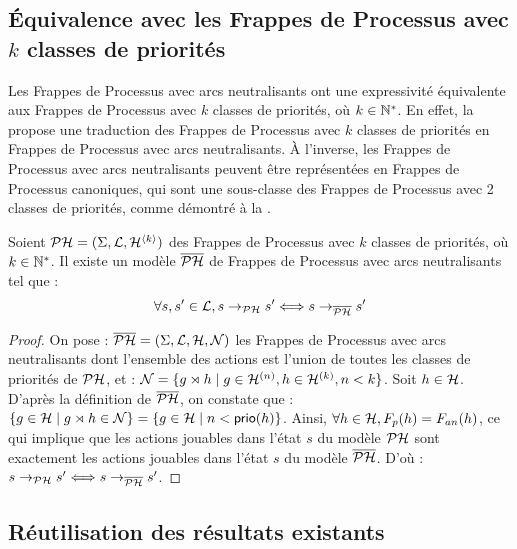 \subsection{Équivalence avec les Frappes de Processus avec $k$ classes de priorités}

Les Frappes de Processus avec arcs neutralisants ont une expressivité équivalente
aux Frappes de Processus avec $k$ classes de priorités, où $k \in \mathbb{N}^*$.
En effet, la  propose une traduction des Frappes de Processus
avec $k$ classes de priorités en Frappes de Processus avec arcs neutralisants.
À l'inverse, les Frappes de Processus avec arcs neutralisants peuvent être représentées
en Frappes de Processus canoniques, qui sont une sous-classe des Frappes de Processus avec
2 classes de priorités, comme démontré à la .

\begin{theorem}
  Soient $\mathcal{PH} = (\Sigma, \mathcal{L}, \mathcal{H}^{{\langle k \rangle}})$ des Frappes de Processus avec $k$ classes
  de priorités, où $k \in \mathbb{N}^*$.
  Il existe un modèle $\overline{\mathcal{PH}}$ de Frappes de Processus avec arcs neutralisants tel que :
  \[\forall s, s' \in \mathcal{L}, s \rightarrow_{\mathcal{PH}} s' \Longleftrightarrow s \rightarrow_{\overline{\mathcal{PH}}} s' \]
\end{theorem}

\begin{proof}
  On pose : $\overline{\mathcal{PH}} = (\Sigma, \mathcal{L}, \mathcal{H}, \mathcal{N})$ les Frappes de Processus avec arcs neutralisants
  dont l'ensemble des actions est l'union de toutes les classes de priorités de $\mathcal{PH}$, et :
  $\mathcal{N} = \{ g\rtimes h \mid g \in \mathcal{H}^{(n)}, h \in \mathcal{H}^{(k)}, n < k \}$.
  Soit $h \in \mathcal{H}$.
  D'après la définition de $\overline{\mathcal{PH}}$, on constate que :
  $\{ g \in \mathcal{H} \mid g\rtimes h \in \mathcal{N} \} = \{ g \in \mathcal{H} \mid n < \mathsf{prio}(h) \}$.
  Ainsi, $\forall h \in \mathcal{H}, F_{p}(h) = F_{an}(h)$,
  ce qui implique que les actions jouables dans l'état $s$ du modèle $\mathcal{PH}$
  sont exactement les actions jouables dans l'état $s$ du modèle $\overline{\mathcal{PH}}$.
  D'où : $s \rightarrow_{\mathcal{PH}} s' \Longleftrightarrow s \rightarrow_{\overline{\mathcal{PH}}} s'$.
\end{proof}



\subsection{Réutilisation des résultats existants}


